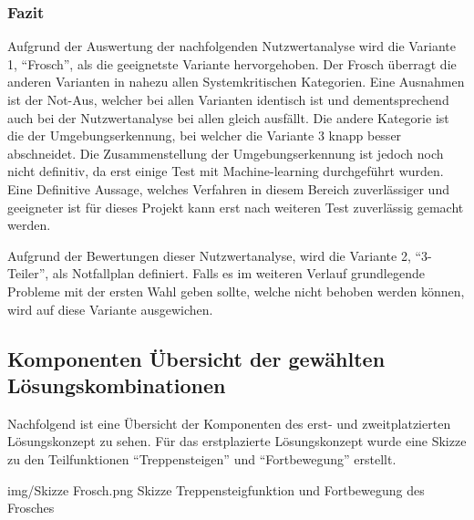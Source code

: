 \subsubsection{Fazit}
Aufgrund der Auswertung der nachfolgenden Nutzwertanalyse wird die Variante 1, ``Frosch'', als die geeignetste Variante hervorgehoben. Der Frosch überragt die anderen Varianten in nahezu allen Systemkritischen Kategorien. Eine Ausnahmen ist der Not-Aus, welcher bei allen Varianten identisch ist und dementsprechend auch bei der Nutzwertanalyse bei allen gleich ausfällt. Die andere Kategorie ist die der Umgebungserkennung, bei welcher die Variante 3 knapp besser abschneidet. Die Zusammenstellung der Umgebungserkennung ist jedoch noch nicht definitiv, da erst einige Test mit Machine-learning durchgeführt wurden. Eine Definitive Aussage, welches Verfahren in diesem Bereich zuverlässiger und geeigneter ist für dieses Projekt kann erst nach weiteren Test zuverlässig gemacht werden.

Aufgrund der Bewertungen dieser Nutzwertanalyse, wird die Variante 2, ``3-Teiler'', als Notfallplan definiert. Falls es im weiteren Verlauf grundlegende Probleme mit der ersten Wahl geben sollte, welche nicht behoben werden können, wird auf diese Variante ausgewichen.

\subsection{Komponenten Übersicht der gewählten Lösungskombinationen}
Nachfolgend ist eine Übersicht der Komponenten des erst- und zweitplatzierten Lösungskonzept zu sehen. Für das erstplazierte Lösungskonzept wurde eine Skizze zu den Teilfunktionen ``Treppensteigen'' und ``Fortbewegung'' erstellt.

\vspace{2cm}

\image
   {img/Skizze Frosch.png}
   {Skizze Treppensteigfunktion und Fortbewegung des Frosches}

